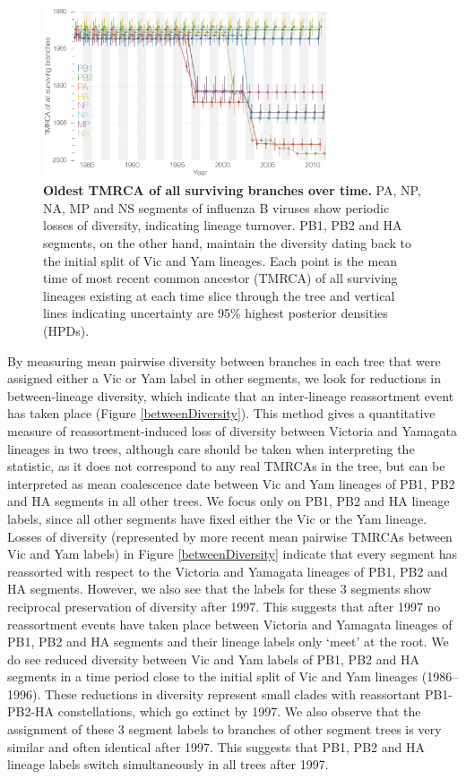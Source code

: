 \documentclass[11pt,oneside,letterpaper]{article}
\begin{document}
\begin{figure}[h]
	\centering		
	\includegraphics[width=0.75\textwidth]{figures/InfB_tmrcaOT_lines.png}
	\caption{\textbf{Oldest TMRCA of all surviving branches over time.}
PA, NP, NA, MP and NS segments of influenza B viruses show periodic losses of diversity, indicating lineage turnover.
PB1, PB2 and HA segments, on the other hand, maintain the diversity dating back to the initial split of Vic and Yam lineages.
Each point is the mean time of most recent common ancestor (TMRCA) of all surviving lineages existing at each time slice through the tree and vertical lines indicating uncertainty are 95\% highest posterior densities (HPDs).}
	\label{tmrcaOT}
\end{figure}

By measuring mean pairwise diversity between branches in each tree that were assigned either a Vic or Yam label in other segments, we look for reductions in between-lineage diversity, which indicate that an inter-lineage reassortment event has taken place (Figure \ref{betweenDiversity}).
This method gives a quantitative measure of reassortment-induced loss of diversity between Victoria and Yamagata lineages in two trees, although care should be taken when interpreting the statistic, as it does not correspond to any real TMRCAs in the tree, but can be interpreted as mean coalescence date between Vic and Yam lineages of PB1, PB2 and HA segments in all other trees.
We focus only on PB1, PB2 and HA lineage labels, since all other segments have fixed either the Vic or the Yam lineage.
Losses of diversity (represented by more recent mean pairwise TMRCAs between Vic and Yam labels) in Figure \ref{betweenDiversity} indicate that every segment has reassorted with respect to the Victoria and Yamagata lineages of PB1, PB2 and HA segments.
However, we also see that the labels for these 3 segments show reciprocal preservation of diversity after 1997.
This suggests that after 1997 no reassortment events have taken place between Victoria and Yamagata lineages of PB1, PB2 and HA segments and their lineage labels only `meet' at the root.
We do see reduced diversity between Vic and Yam labels of PB1, PB2 and HA segments in a time period close to the initial split of Vic and Yam lineages (1986--1996).
These reductions in diversity represent small clades with reassortant PB1-PB2-HA constellations, which go extinct by 1997.
We also observe that the assignment of these 3 segment labels to branches of other segment trees is very similar and often identical after 1997.
This suggests that PB1, PB2 and HA lineage labels switch simultaneously in all trees after 1997.
\end{document}
